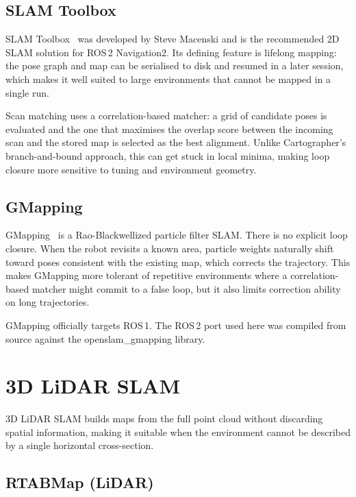 \subsection{SLAM Toolbox}

SLAM Toolbox~\cite{macenski2021slamtoolbox} was developed by Steve Macenski and is the recommended 2D SLAM
solution for ROS\,2 Navigation2. Its defining feature is lifelong mapping:
the pose graph and map can be serialised to disk and resumed in a later
session, which makes it well suited to large environments that cannot be
mapped in a single run.

Scan matching uses a correlation-based matcher: a grid of candidate poses is
evaluated and the one that maximises the overlap score between the incoming
scan and the stored map is selected as the best alignment. Unlike Cartographer's
branch-and-bound approach, this can get stuck in local minima, making loop
closure more sensitive to tuning and environment geometry.

\subsection{GMapping}

GMapping~\cite{grisetti2007gmapping} is a Rao-Blackwellized particle filter SLAM.
There is no explicit loop closure. When the robot revisits a known area,
particle weights naturally shift toward poses consistent with the existing map,
which corrects the trajectory. This makes GMapping more tolerant of
repetitive environments where a correlation-based matcher might commit to a
false loop, but it also limits correction ability on long trajectories.

GMapping officially targets ROS\,1. The ROS\,2 port used here was compiled
from source against the openslam\_gmapping library.

\section{3D LiDAR SLAM}

3D LiDAR SLAM builds maps from the full point cloud without discarding spatial
information, making it suitable when the environment cannot be described by a
single horizontal cross-section.

\subsection{RTABMap (LiDAR)}

